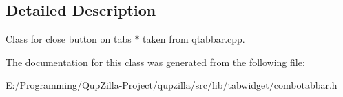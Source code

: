 \subsection{Detailed Description}
Class for close button on tabs $\ast$ taken from qtabbar.cpp. 

The documentation for this class was generated from the following file:\begin{DoxyCompactItemize}
\item 
E:/Programming/QupZilla-\/Project/qupzilla/src/lib/tabwidget/combotabbar.h\end{DoxyCompactItemize}
